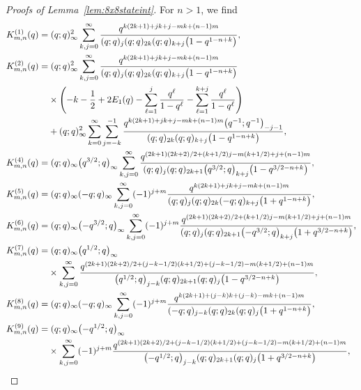 \documentclass[pdftex]{sigma}
\numberwithin{equation}{section}
\begin{document}
\begin{proof}[Proofs of Lemma~\ref{lem:8x8stateint}]
For $n>1$, we find
\begin{align}
& K^{(1)}_{m,n}(q)
 =
 (q;q)_{\infty}^2\sum_{k,j=0}^{\infty}\frac{q^{k(2k+1)+jk+j-mk+(n-1)m}}{(q;q)_{j}(q;q)_{2k}(q;q)_{k+j}\bigl(1-q^{1-n+k}\bigr)},
 \nonumber\\
& K^{(2)}_{m,n}(q)
 =
 (q;q)_{\infty}^2\sum_{k,j=0}^{\infty}
 \frac{q^{k(2k+1)+jk+j-mk+(n-1)m}}{(q;q)_{j}(q;q)_{2k}(q;q)_{k+j}\bigl(1-q^{1-n+k}\bigr)}\nonumber\\
 &\hphantom{K^{(2)}_{m,n}(q)=}{}\times
 \left(-k-\frac{1}{2}+2E_{1}(q) -\sum_{\ell=1}^{j}\frac{q^\ell}{1-q^\ell}-\sum_{\ell=1}^{k+j}\frac{q^\ell}{1-q^\ell}\right)\nonumber\\
 &\hphantom{K^{(2)}_{m,n}(q)=}{} +(q;q)_{\infty}^2\sum_{k=0}^{\infty}\sum_{j=-k}^{-1}
 \frac{q^{k(2k+1)+jk+j-mk+(n-1)m}\bigl(q^{-1};q^{-1}\bigr)_{-j-1}}{(q;q)_{2k}(q;q)_{k+j}\bigl(1-q^{1-n+k}\bigr)},\nonumber\\
 & K^{(4)}_{m,n}(q)
=
 (q;q)_{\infty}\bigl(q^{3/2};q\bigr)_{\infty}\sum_{k,j=0}^{\infty}\frac{q^{(2k+1)(2k+2)/2+(k+1/2)j-m(k+1/2)+j+(n-1)m}} {(q;q)_{j}(q;q)_{2k+1}\bigl(q^{3/2};q\bigr)_{k+j}\bigl(1-q^{3/2-n+k}\bigr)},\nonumber\\
 & K^{(5)}_{m,n}(q)
=
 (q;q)_{\infty}(-q;q)_{\infty}\sum_{k,j=0}^{\infty}(-1)^{j+m}\frac{q^{k(2k+1)+jk+j-mk+(n-1)m}}{(q;q)_{j}(q;q)_{2k}(-q;q)_{k+j}\bigl(1+q^{1-n+k}\bigr)},\nonumber\\
& K^{(6)}_{m,n}(q)
 =
 (q;q)_{\infty}\bigl(-q^{3/2};q\bigr)_{\infty}\sum_{k,j=0}^{\infty}(-1)^{j+m}\frac{q^{(2k+1)(2k+2)/2+(k+1/2)j-m(k+1/2)+j+(n-1)m}}{(q;q)_{j} (q;q)_{2k+1}\bigl(-q^{3/2};q\bigr)_{k+j}\bigl(1+q^{3/2-n+k}\bigr)},\nonumber\\
& K^{(7)}_{m,n}(q)
 =
 (q;q)_{\infty}\bigl(q^{1/2};q\bigr)_{\infty}\nonumber\\
&\hphantom{K^{(7)}_{m,n}(q)=}{}\times
\sum_{k,j=0}^{\infty}\frac{q^{(2k+1)(2k+2)/2+(j-k-1/2)(k+1/2)+(j-k-1/2)-m(k+1/2)+(n-1)m}} {\bigl(q^{1/2};q\bigr)_{j-k}(q;q)_{2k+1}(q;q)_{j}\bigl(1-q^{3/2-n+k}\bigr)},\nonumber\\
& K^{(8)}_{m,n}(q)
 =
 (q;q)_{\infty}(-q;q)_{\infty}\sum_{k,j=0}^{\infty}(-1)^{j+m}\frac{q^{k(2k+1)+(j-k)k+(j-k)-mk+(n-1)m}} {(-q;q)_{j-k}(q;q)_{2k}(q;q)_{j}\bigl(1+q^{1-n+k}\bigr)},\nonumber\\
& K^{(9)}_{m,n}(q)
 =
 (q;q)_{\infty}\bigl(-q^{1/2};q\bigr)_{\infty} \label{eq:theqser.ler}\\
 &\phantom{K^{(9)}_{m,n}(q)=}{}\times
 \sum_{k,j=0}^{\infty}(-1)^{j+m} \frac{q^{(2k+1)(2k+2)/2+(j-k-1/2)(k+1/2)+(j-k-1/2)-m(k+1/2)+(n-1)m}}{\bigl(-q^{1/2};q\bigr)_{j-k}(q;q)_{2k+1}(q;q)_{j}\bigl(1+q^{3/2-n+k}\bigr)},\nonumber

\end{align}
\end{proof}
\end{document}
